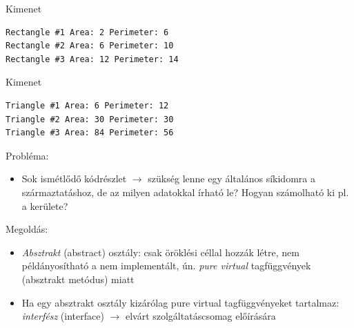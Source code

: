 \begin{frame}[fragile]
    \begin{exampleblock}{}
        \vspace{-.2cm}
        \fontsize{7}{8} \selectfont
        
        \vspace{-.2cm}
    \end{exampleblock}
    \begin{block}{Kimenet}
        \vspace{-.4cm}
        \fontsize{7}{8} \selectfont
        \begin{verbatim}
Rectangle #1 Area: 2 Perimeter: 6
Rectangle #2 Area: 6 Perimeter: 10
Rectangle #3 Area: 12 Perimeter: 14
        \end{verbatim}
        \vspace{-.6cm}
    \end{block}
\end{frame}

\begin{frame}[fragile]
    \begin{exampleblock}{}
        \vspace{-.2cm}
        \fontsize{8}{9} \selectfont
        
        \vspace{-.2cm}
    \end{exampleblock}
    \begin{block}{Kimenet}
        \vspace{-.4cm}
        \fontsize{8}{9} \selectfont
        \begin{verbatim}
Triangle #1 Area: 6 Perimeter: 12
Triangle #2 Area: 30 Perimeter: 30
Triangle #3 Area: 84 Perimeter: 56
        \end{verbatim}
        \vspace{-.6cm}
    \end{block}
\end{frame}

\begin{frame}
    Probléma:
    \begin{itemize}
        \item Sok ismétlődő kódrészlet $\to$ szükség lenne egy általános síkidomra a származtatáshoz, de az milyen adatokkal írható le? Hogyan számolható ki pl. a kerülete?
    \end{itemize}
    Megoldás:
    \begin{itemize}
        \item \emph{Absztrakt} (abstract) osztály: csak öröklési céllal hozzák létre, nem példányosítható a nem implementált, ún. \emph{pure virtual} tagfüggvények (absztrakt metódus) miatt
        \item Ha egy absztrakt osztály kizárólag pure virtual tagfüggvényeket tartalmaz: \emph{interfész} (interface) $\to$ elvárt szolgáltatáscsomag előírására
    \end{itemize}
\end{frame}

